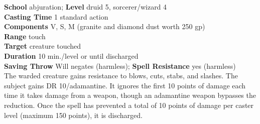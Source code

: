 \textbf{School} abjuration; \textbf{Level} druid 5, sorcerer/wizard 4\\
\textbf{Casting Time} 1 standard action\\
\textbf{Components} V, S, M (granite and diamond dust worth 250 gp)\\
\textbf{Range} touch\\
\textbf{Target} creature touched\\
\textbf{Duration} 10 min./level or until discharged\\
\textbf{Saving Throw }Will negates (harmless); \textbf{Spell Resistance} yes (harmless)\\
The warded creature gains resistance to blows, cuts, stabs, and slashes. The subject gains DR 10/adamantine. It ignores the first 10 points of damage each time it takes damage from a weapon, though an adamantine weapon bypasses the reduction. Once the spell has prevented a total of 10 points of damage per caster level (maximum 150 points), it is discharged.\\
